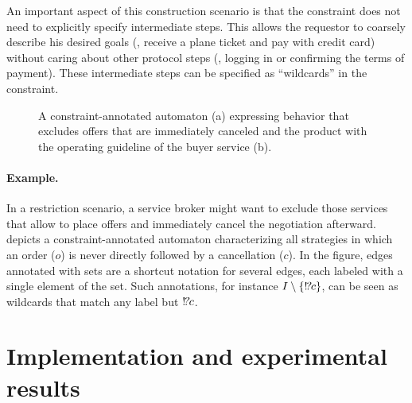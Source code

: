 An important aspect of this construction scenario is that the constraint does not need to explicitly specify intermediate steps. This allows the requestor to coarsely describe his desired goals (\eg, receive a plane ticket and pay with credit card) without caring about other protocol steps (\eg, logging in or confirming the terms of payment). These intermediate steps can be specified as ``wildcards'' in the constraint.

\begin{figure}
\centering
{}\hfill
{}
\caption{A constraint-annotated automaton (a) expressing behavior that excludes offers that are immediately canceled and the product with the operating guideline of the buyer service (b).}
\label{validation:fig:example2}
\end{figure}

\medskip


\paragraph{Example.}

In a restriction scenario, a service broker might want to exclude those services that allow to place offers and immediately cancel the negotiation afterward.  depicts a constraint-annotated automaton characterizing all strategies in which an order ($o$) is never directly followed by a cancellation ($c$). In the figure, edges annotated with sets are a shortcut notation for several edges, each labeled with a single element of the set. Such annotations, for instance $I\setminus \{!\!\textsl{?} c\}$, can be seen as wildcards that match any label but $!\!\textsl{?} c$.





\section{Implementation and experimental results}
\label{sect:validation_implementation}

